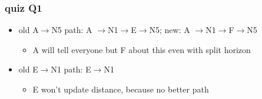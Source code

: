 \begin{frame}[fragile]
\frametitle{quiz Q1}
\begin{itemize}
\item old A$\rightarrow$N5 path: A $\rightarrow$N1$\rightarrow$E$\rightarrow$N5; new: A $\rightarrow$N1$\rightarrow$F$\rightarrow$N5
    \begin{itemize}
    \item A will tell everyone but F about this even with split horizon
    \end{itemize}
\item old E$\rightarrow$N1 path: E$\rightarrow$N1
    \begin{itemize}
    \item E won't update distance, because no better path
    \end{itemize}
\end{itemize}
\end{frame}

